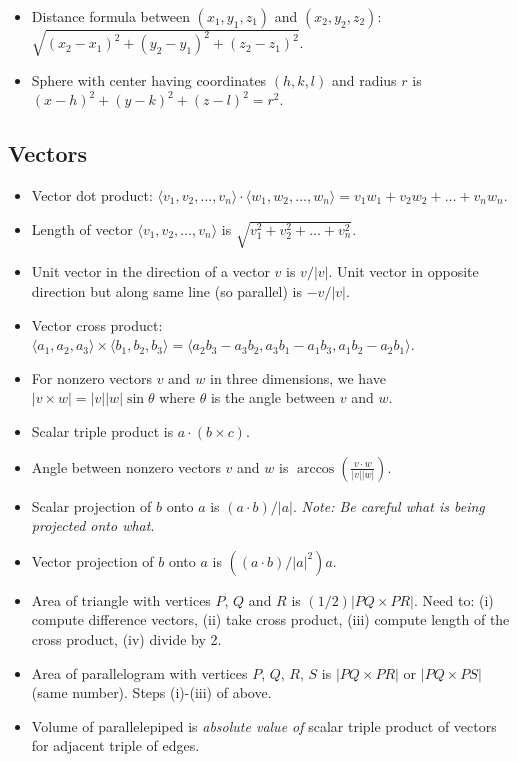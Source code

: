 \documentclass[10pt]{amsart}
\begin{document}
\begin{itemize}
\item Distance formula between $(x_1,y_1,z_1)$ and $(x_2,y_2,z_2)$:
  $\sqrt{(x_2 - x_1)^2 + (y_2 - y_1)^2 + (z_2 - z_1)^2}$.
\item Sphere with center having coordinates $(h,k,l)$ and radius $r$
  is $(x - h)^2 + (y - k)^2 + (z - l)^2 = r^2$.
\end{itemize}

\subsection{Vectors}

\begin{itemize}
\item Vector dot product: $\langle v_1,v_2,\dots, v_n \rangle \cdot
  \langle w_1,w_2,\dots,w_n \rangle = v_1w_1 + v_2w_2 + \dots + v_nw_n$.
\item Length of vector $\langle v_1,v_2,\dots,v_n \rangle$ is
  $\sqrt{v_1^2 + v_2^2 + \dots + v_n^2}$.
\item Unit vector in the direction of a vector $v$ is $v/|v|$. Unit
  vector in opposite direction but along same line (so parallel) is
  $-v/|v|$.
\item Vector cross product: $\langle a_1, a_2, a_3 \rangle \times
  \langle b_1, b_2, b_3 \rangle = \langle a_2b_3 - a_3b_2, a_3b_1 -
  a_1b_3, a_1b_2 - a_2b_1 \rangle$.
\item For nonzero vectors $v$ and $w$ in three dimensions, we have $|v
  \times w| = |v||w|\sin \theta$ where $\theta$ is the angle between
  $v$ and $w$.
\item Scalar triple product is $a \cdot (b \times c)$.
\item Angle between nonzero vectors $v$ and $w$ is
  $\arccos\left(\frac{v \cdot w}{|v||w|}\right)$.
\item Scalar projection of $b$ onto $a$ is $(a \cdot b)/|a|$. {\em
  Note: Be careful what is being projected onto what}.
\item Vector projection of $b$ onto $a$ is $((a \cdot b)/|a|^2)a$.
\item Area of triangle with vertices $P$, $Q$ and $R$ is $(1/2)|PQ
  \times PR|$. Need to: (i) compute difference vectors, (ii) take
  cross product, (iii) compute length of the cross product, (iv)
  divide by 2.
\item Area of parallelogram with vertices $P$, $Q$, $R$, $S$ is $|PQ
  \times PR|$ or $|PQ \times PS|$ (same number). Steps (i)-(iii) of above.
\item Volume of parallelepiped is {\em absolute value of} scalar triple
  product of vectors for adjacent triple of edges.
\end{itemize}
\end{document}
